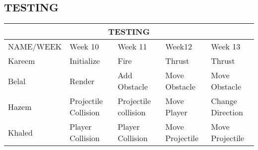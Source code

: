 \documentclass[]{article}
\begin{document}
\subsection{TESTING}

\begin{tabular}{|p{2.5cm}|p{3cm}|p{3cm}|p{3cm}|p{3cm}|}
 \hline
 \multicolumn{5}{|c|}{TESTING} \\
 \hline
 NAME/WEEK & Week 10 & Week 11 & Week12 & Week 13\\
 \hline
 Kareem & Initialize & Fire & Thrust & Thrust \\
 \hline
 Belal& Render & Add Obstacle & Move Obstacle & Move Obstacle \\
 \hline
 Hazem & Projectile Collision & Projectile collision & Move Player & Change Direction\\
 \hline
 Khaled & Player Collision & Player Collision &  Move Projectile &Move Projectile\\
 \hline
\end{tabular}
\end{document}
